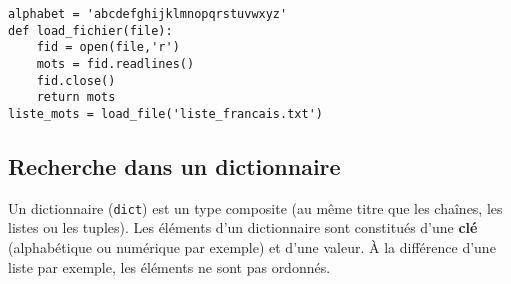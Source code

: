 \begin{lstlisting}
alphabet = 'abcdefghijklmnopqrstuvwxyz'
def load_fichier(file):
    fid = open(file,'r')
    mots = fid.readlines()
    fid.close()
    return mots
liste_mots = load_file('liste_francais.txt')
\end{lstlisting}




%
%


\subsection*{Recherche dans un dictionnaire}

Un dictionnaire (\texttt{dict}) est un type composite (au même titre que les chaînes, les listes ou les tuples). Les éléments d'un dictionnaire sont constitués d'une \textbf{clé} (alphabétique ou numérique par exemple) et d'une valeur. À la différence d'une liste par exemple, les éléments ne sont pas ordonnés.

